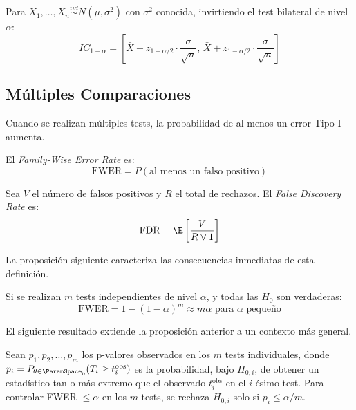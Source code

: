 \begin{corollary}
	\label{cor:ch4-ic-z}
	Para $X_1, \ldots, X_n \overset{iid}{\sim} N(\mu, \sigma^2)$ con $\sigma^2$
	conocida, invirtiendo el test bilateral de nivel $\alpha$:
	\[
		IC_{1-\alpha} = \left[\bar{X} - z_{1-\alpha/2} \cdot \frac{\sigma}{\sqrt{n}}, \,
			\bar{X} + z_{1-\alpha/2} \cdot \frac{\sigma}{\sqrt{n}}\right]
	\]
\end{corollary}

\subsection{Múltiples Comparaciones}
\label{sec:ch4-multiples}

Cuando se realizan múltiples tests, la probabilidad de al menos un error
Tipo I aumenta.

\begin{definition}
	\label{def:ch4-fwer-fdr}
	El \emph{Family-Wise Error Rate} es:
	\[
		\text{FWER} = P(\text{al menos un falso positivo})
	\]

	Sea $V$ el número de falsos positivos y $R$ el total de rechazos. El
	\emph{False Discovery Rate} es:
	\[
		\text{FDR} = \E\left[\frac{V}{R \vee 1}\right]
	\]
\end{definition}

La proposición siguiente caracteriza las consecuencias inmediatas de esta definición.

\begin{proposition}
	\label{prop:ch4-multiplicidad}
	Si se realizan $m$ tests independientes de nivel $\alpha$, y todas las
	$H_0$ son verdaderas:
	\[
		\text{FWER} = 1 - (1-\alpha)^m \approx m\alpha \text{ para } \alpha \text{ pequeño}
	\]
\end{proposition}

El siguiente resultado extiende la proposición anterior a un contexto más general.

\begin{theorem}
	\label{thm:ch4-bonferroni}
	Sean $p_1, p_2, \ldots, p_m$ los p-valores observados en los $m$ tests
	individuales, donde $p_i = P_{\theta \in \ParamSpace_0}(T_i \geq t_i^{\text{obs}})$
	es la probabilidad, bajo $H_{0,i}$, de obtener un estadístico tan o más
	extremo que el observado $t_i^{\text{obs}}$ en el $i$-ésimo test.
	Para controlar FWER $\leq \alpha$ en los $m$ tests, se rechaza $H_{0,i}$
	solo si $p_i \leq \alpha/m$.
\end{theorem}

